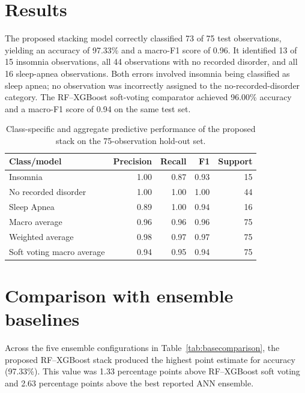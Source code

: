 ﻿\documentclass[preprint,12pt]{elsarticle}
\begin{document}
\section{Results}
The proposed stacking model correctly classified 73 of 75 test observations, yielding an accuracy of 97.33\% and a macro-F1 score of 0.96. It identified 13 of 15 insomnia observations, all 44 observations with no recorded disorder, and all 16 sleep-apnea observations. Both errors involved insomnia being classified as sleep apnea; no observation was incorrectly assigned to the no-recorded-disorder category. The RF--XGBoost soft-voting comparator achieved 96.00\% accuracy and a macro-F1 score of 0.94 on the same test set.

\begin{table}[t]
\centering
\caption{Class-specific and aggregate predictive performance of the proposed stack on the 75-observation hold-out set.}
\label{tab:metrics}
\small
\begin{tabular}{lrrrr}
\toprule
Class/model & Precision & Recall & F1 & Support \\
\midrule
Insomnia & 1.00 & 0.87 & 0.93 & 15 \\
No recorded disorder & 1.00 & 1.00 & 1.00 & 44 \\
Sleep Apnea & 0.89 & 1.00 & 0.94 & 16 \\
Macro average & 0.96 & 0.96 & 0.96 & 75 \\
Weighted average & 0.98 & 0.97 & 0.97 & 75 \\
\midrule
Soft voting macro average & 0.94 & 0.95 & 0.94 & 75 \\
\bottomrule
\end{tabular}
\end{table}





\section{Comparison with ensemble baselines}
Across the five ensemble configurations in Table~\ref{tab:basecomparison}, the proposed RF--XGBoost stack produced the highest point estimate for accuracy (97.33\%). This value was 1.33 percentage points above RF--XGBoost soft voting and 2.63 percentage points above the best reported ANN ensemble.
\end{document}
